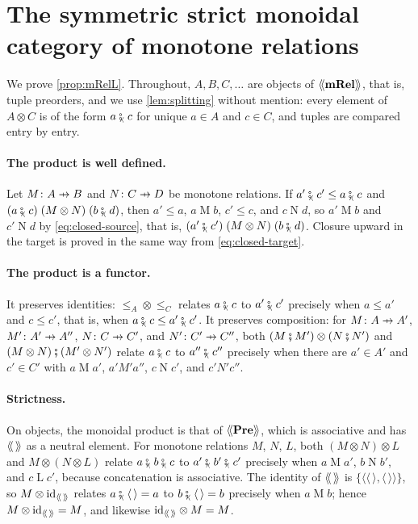 \documentclass[11pt,a4paper]{article}
\theoremstyle{plain}
\theoremstyle{definition}
\theoremstyle{remark}
\newcommand{\Cat}[1]{\mathbf{#1}}
\newcommand{\Pre}{\Cat{Pre}}
\newcommand{\mRel}{\Cat{mRel}}
\providecommand{\llangle}{\mathopen{\langle\mkern-3.5mu\langle}}
\providecommand{\rrangle}{\mathclose{\rangle\mkern-3.5mu\rangle}}
\newcommand{\tL}[1]{\llangle #1 \rrangle}
\newcommand{\then}{\mathbin{\fatsemi}}
\newcommand{\tc}{\mathbin{\fatsemi_{\!\scriptscriptstyle\langle}}}
\newcommand{\tup}[1]{\langle #1 \rangle}
\newcommand{\etup}{\langle\,\rangle}
\newcommand{\profto}{\mathrel{\ooalign{\hfil$\mapstochar\mkern 5mu$\hfil\cr$\to$\cr}}}
\newcommand{\rel}[3]{#1 \mathrel{#2} #3}
\newcommand{\id}{\mathrm{id}}
\begin{document}
\appendix

\section{The symmetric strict monoidal category of monotone relations}
\label{app:mrel-strict}

We prove \cref{prop:mRelL}.
Throughout, $A, B, C, \ldots$ are objects of $\tL{\mRel}$, that is, tuple preorders, and we use \cref{lem:splitting} without mention: every element of $A \otimes C$ is of the form $a \tc c$ for unique $a \in A$ and $c \in C$, and tuples are compared entry by entry.

\paragraph{The product is well defined.}
Let $M \colon A \profto B$ and $N \colon C \profto D$ be monotone relations.
If $a' \tc c' \leq a \tc c$ and $\rel{(a \tc c)}{(M \otimes N)}{(b \tc d)}$, then $a' \leq a$, $\rel{a}{M}{b}$, $c' \leq c$, and $\rel{c}{N}{d}$, so $\rel{a'}{M}{b}$ and $\rel{c'}{N}{d}$ by \cref{eq:closed-source}, that is, $\rel{(a' \tc c')}{(M \otimes N)}{(b \tc d)}$.
Closure upward in the target is proved in the same way from \cref{eq:closed-target}.

\paragraph{The product is a functor.}
It preserves identities: ${\leq_A} \otimes {\leq_C}$ relates $a \tc c$ to $a' \tc c'$ precisely when $a \leq a'$ and $c \leq c'$, that is, when $a \tc c \leq a' \tc c'$.
It preserves composition: for $M \colon A \profto A'$, $M' \colon A' \profto A''$, $N \colon C \profto C'$, and $N' \colon C' \profto C''$, both $(M \then M') \otimes (N \then N')$ and $(M \otimes N) \then (M' \otimes N')$ relate $a \tc c$ to $a'' \tc c''$ precisely when there are $a' \in A'$ and $c' \in C'$ with $\rel{a}{M}{a'}$, $\rel{a'}{M'}{a''}$, $\rel{c}{N}{c'}$, and $\rel{c'}{N'}{c''}$.

\paragraph{Strictness.}
On objects, the monoidal product is that of $\tL{\Pre}$, which is associative and has $\tL{\,}$ as a neutral element.
For monotone relations $M$, $N$, $L$, both $(M \otimes N) \otimes L$ and $M \otimes (N \otimes L)$ relate $a \tc b \tc c$ to $a' \tc b' \tc c'$ precisely when $\rel{a}{M}{a'}$, $\rel{b}{N}{b'}$, and $\rel{c}{L}{c'}$, because concatenation is associative.
The identity of $\tL{\,}$ is $\{\tup{\etup, \etup}\}$, so $M \otimes \id_{\tL{\,}}$ relates $a \tc \etup = a$ to $b \tc \etup = b$ precisely when $\rel{a}{M}{b}$; hence $M \otimes \id_{\tL{\,}} = M$, and likewise $\id_{\tL{\,}} \otimes M = M$.
\end{document}
